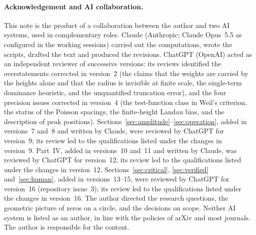 \documentclass[11pt,a4paper]{article}
\theoremstyle{definition}\newtheorem{definition}[proposition]{Definition}
\theoremstyle{remark}\newtheorem{remark}[proposition]{Remark}
\begin{document}
\paragraph{Acknowledgement and AI collaboration.} This note is the product of a collaboration between the author and two AI systems, used in complementary roles. Claude (Anthropic; Claude Opus~5.5 as configured in the working sessions) carried out the computations, wrote the scripts, drafted the text and produced the revisions. ChatGPT (OpenAI) acted as an independent reviewer of successive versions: its reviews identified the overstatements corrected in version~2 (the claims that the weights are carried by the heights alone and that the radius is invisible at finite scale, the single-term dominance heuristic, and the unquantified truncation error), and the four precision issues corrected in version~4 (the test-function class in Weil's criterion, the status of the Poisson spacings, the finite-height Landau bias, and the description of peak positions). Sections~\ref{sec:amplitude}--\ref{sec:operation}, added in versions~7 and~8 and written by Claude, were reviewed by ChatGPT for version~9; its review led to the qualifications listed under the changes in version~9. Part~IV, added in versions~10 and~11 and written by Claude, was reviewed by ChatGPT for version~12; its review led to the qualifications listed under the changes in version~12. Sections~\ref{sec:critical}, \ref{sec:verified} and~\ref{sec:human}, added in versions~13--15, were reviewed by ChatGPT for version~16 (repository issue~3); its review led to the qualifications listed under the changes in version~16. The author directed the research questions, the geometric picture of zeros on a circle, and the decisions on scope. Neither AI system is listed as an author, in line with the policies of arXiv and most journals. The author is responsible for the content.
\end{document}
